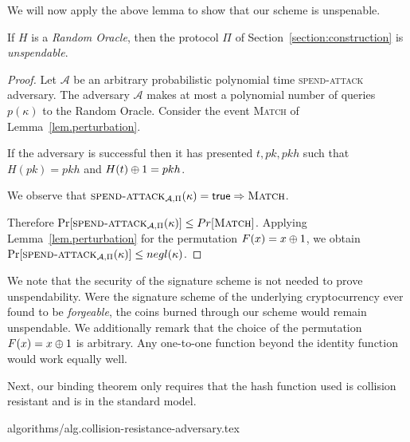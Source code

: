 We will now apply the above lemma to show that our scheme is unspenable.

\begin{theorem}[Unspendability]
  If $H$ is a \emph{Random Oracle}, then the protocol $\Pi$ of Section~\ref{section:construction} is \emph{unspendable}.
\end{theorem}
\begin{proof}
  Let $\mathcal{A}$ be an arbitrary probabilistic polynomial time \textsc{spend-attack} adversary.
  The adversary $\mathcal{A}$ makes at most a polynomial number of queries $p(\kappa)$ to the Random Oracle.
  Consider the event \textsc{Match} of Lemma~\ref{lem.perturbation}.

  If the adversary is successful then it has presented $t, pk, pkh$ such that $H(pk) = pkh$ and $H(t) \oplus 1 = pkh$.

  We observe that $\textsc{spend-attack}_{\mathcal{A}, \Pi}(\kappa) = \mathsf{true} \Rightarrow \textsc{Match}$.

  Therefore $\Pr[\textsc{spend-attack}_{\mathcal{A}, \Pi}(\kappa)] \leq Pr[\textsc{Match}]$. Applying Lemma~\ref{lem.perturbation} for the permutation $F(x) = x \oplus 1$,
  we obtain
  $\Pr[\textsc{spend-attack}_{\mathcal{A}, \Pi}(\kappa)] \leq negl(\kappa)$.
\end{proof}

We note that the security of the signature scheme is not needed to prove unspendability. Were the signature scheme of the underlying cryptocurrency ever found to be \emph{forgeable}, the coins burned through our scheme would remain unspendable. We additionally remark that the
choice of the permutation $F(x) = x \oplus 1$ is arbitrary. Any one-to-one
function beyond the identity function would work equally well.

Next, our binding theorem only requires that the hash function used is collision
resistant and is in the standard model.

{algorithms/alg.collision-resistance-adversary.tex}

